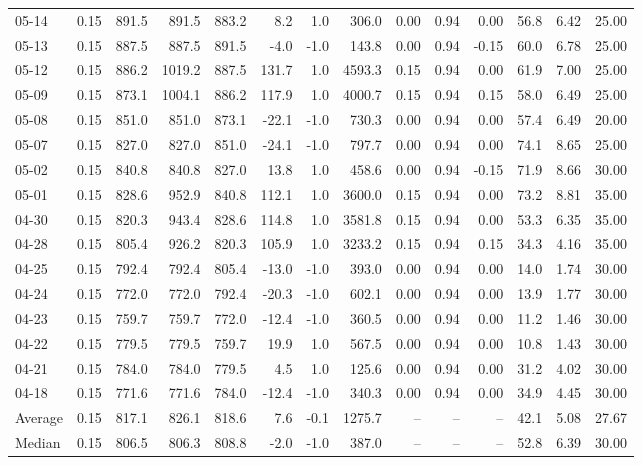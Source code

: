 \begin{threeparttable}
{\begin{tabular}{lrrrrrrrrrrrrr}
05-14 & 0.15 & 891.5 & 891.5 & 883.2 & 8.2 & 1.0 & 306.0 & 0.00 & 0.94 & 0.00 & 56.8 & 6.42 & 25.00 \\
05-13 & 0.15 & 887.5 & 887.5 & 891.5 & -4.0 & -1.0 & 143.8 & 0.00 & 0.94 & -0.15 & 60.0 & 6.78 & 25.00 \\
05-12 & 0.15 & 886.2 & 1019.2 & 887.5 & 131.7 & 1.0 & 4593.3 & 0.15 & 0.94 & 0.00 & 61.9 & 7.00 & 25.00 \\
05-09 & 0.15 & 873.1 & 1004.1 & 886.2 & 117.9 & 1.0 & 4000.7 & 0.15 & 0.94 & 0.15 & 58.0 & 6.49 & 25.00 \\
05-08 & 0.15 & 851.0 & 851.0 & 873.1 & -22.1 & -1.0 & 730.3 & 0.00 & 0.94 & 0.00 & 57.4 & 6.49 & 20.00 \\
05-07 & 0.15 & 827.0 & 827.0 & 851.0 & -24.1 & -1.0 & 797.7 & 0.00 & 0.94 & 0.00 & 74.1 & 8.65 & 25.00 \\
05-02 & 0.15 & 840.8 & 840.8 & 827.0 & 13.8 & 1.0 & 458.6 & 0.00 & 0.94 & -0.15 & 71.9 & 8.66 & 30.00 \\
05-01 & 0.15 & 828.6 & 952.9 & 840.8 & 112.1 & 1.0 & 3600.0 & 0.15 & 0.94 & 0.00 & 73.2 & 8.81 & 35.00 \\
04-30 & 0.15 & 820.3 & 943.4 & 828.6 & 114.8 & 1.0 & 3581.8 & 0.15 & 0.94 & 0.00 & 53.3 & 6.35 & 35.00 \\
04-28 & 0.15 & 805.4 & 926.2 & 820.3 & 105.9 & 1.0 & 3233.2 & 0.15 & 0.94 & 0.15 & 34.3 & 4.16 & 35.00 \\
04-25 & 0.15 & 792.4 & 792.4 & 805.4 & -13.0 & -1.0 & 393.0 & 0.00 & 0.94 & 0.00 & 14.0 & 1.74 & 30.00 \\
04-24 & 0.15 & 772.0 & 772.0 & 792.4 & -20.3 & -1.0 & 602.1 & 0.00 & 0.94 & 0.00 & 13.9 & 1.77 & 30.00 \\
04-23 & 0.15 & 759.7 & 759.7 & 772.0 & -12.4 & -1.0 & 360.5 & 0.00 & 0.94 & 0.00 & 11.2 & 1.46 & 30.00 \\
04-22 & 0.15 & 779.5 & 779.5 & 759.7 & 19.9 & 1.0 & 567.5 & 0.00 & 0.94 & 0.00 & 10.8 & 1.43 & 30.00 \\
04-21 & 0.15 & 784.0 & 784.0 & 779.5 & 4.5 & 1.0 & 125.6 & 0.00 & 0.94 & 0.00 & 31.2 & 4.02 & 30.00 \\
04-18 & 0.15 & 771.6 & 771.6 & 784.0 & -12.4 & -1.0 & 340.3 & 0.00 & 0.94 & 0.00 & 34.9 & 4.45 & 30.00 \\
Average & 0.15 & 817.1 & 826.1 & 818.6 & 7.6 & -0.1 & 1275.7 & -- & -- & -- & 42.1 & 5.08 & 27.67 \\
Median & 0.15 & 806.5 & 806.3 & 808.8 & -2.0 & -1.0 & 387.0 & -- & -- & -- & 52.8 & 6.39 & 30.00 \\

\end{tabular}}
\end{threeparttable}
